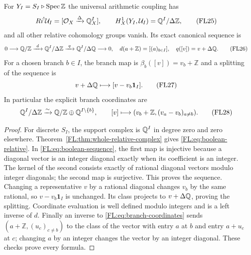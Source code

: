 \begin{theorem}
\label{FL:thm:boolean-relative}
For $Y_I=S_I\triangleright\operatorname{Spec}\mathbb Z$ the universal arithmetic
coupling has
\[
 Ri^!\mathcal U_I=[\mathcal O_X\xrightarrow\Delta\mathbb Q_X^I],
 \qquad H_X^1(Y_I,\mathcal U_I)=\mathbb Q^I/\Delta\mathbb Z,
 \tag{FL25}\label{FL:eq:boolean-relative}
\]
and all other relative cohomology groups vanish. Its exact canonical
sequence is
\[
 0\longrightarrow\mathbb Q/\mathbb Z
 \xrightarrow{\ d\ }\mathbb Q^I/\Delta\mathbb Z
 \xrightarrow{\ q\ }\mathbb Q^I/\Delta\mathbb Q\longrightarrow0,
 \quad d(a+\mathbb Z)=[(a)_{b\in I}],\quad q([v])=v+\Delta\mathbb Q.
 \tag{FL26}\label{FL:eq:boolean-sequence}
\]
For a chosen branch $b\in I$, the branch map is
$\beta_b([v])=v_b+\mathbb Z$ and a splitting of the sequence is
\[
 v+\Delta\mathbb Q\longmapsto[v-v_b\mathbf1_I].
 \tag{FL27}\label{FL:eq:branch-splitting}
\]
In particular the explicit branch coordinates are
\[
 \mathbb Q^I/\Delta\mathbb Z\xrightarrow{\sim}
 \mathbb Q/\mathbb Z\oplus\mathbb Q^{I\setminus\{b\}},\qquad
 [v]\longmapsto(v_b+\mathbb Z,(v_a-v_b)_{a\ne b}).
 \tag{FL28}\label{FL:eq:branch-coordinates}
\]
\end{theorem}
\begin{proof}
For discrete $S_I$, the support complex is $\mathbb Q^I$ in degree zero
and zero elsewhere. Theorem~\ref{FL:thm:whole-relative-complex} gives
\eqref{FL:eq:boolean-relative}. In \eqref{FL:eq:boolean-sequence}, the
first map is injective because a diagonal vector is an integer
diagonal exactly when its coefficient is an integer. The kernel of
the second consists exactly of rational diagonal vectors modulo
integer diagonals; the second map is surjective. This proves the
sequence. Changing a representative $v$ by a rational diagonal
changes $v_b$ by the same rational, so
$v-v_b\mathbf1_I$ is unchanged. Its class projects to
$v+\Delta\mathbb Q$, proving the splitting. Coordinate evaluation is well
defined modulo integers and is a left inverse of $d$. Finally an
inverse to \eqref{FL:eq:branch-coordinates} sends
$(a+\mathbb Z,(u_c)_{c\ne b})$ to the class of the vector with entry
$a$ at $b$ and entry $a+u_c$ at $c$; changing $a$ by an integer changes
the vector by an integer diagonal. These checks prove every formula.
\end{proof}

